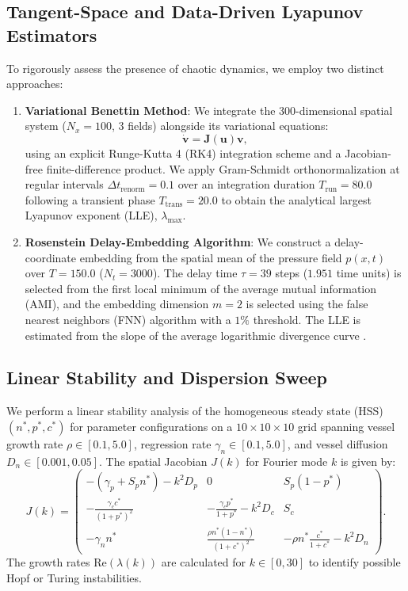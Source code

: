 \documentclass[review,3p,times]{elsarticle}
\begin{document}
\subsection{Tangent-Space and Data-Driven Lyapunov Estimators}
To rigorously assess the presence of chaotic dynamics, we employ two distinct approaches:
\begin{enumerate}
  \item \textbf{Variational Benettin Method}: We integrate the 300-dimensional spatial system ($N_x = 100$, 3 fields) alongside its variational equations:
  \begin{equation}
  \dot{\mathbf{v}} = \mathbf{J}(\mathbf{u})\mathbf{v},
  \end{equation}
  using an explicit Runge-Kutta 4 (RK4) integration scheme and a Jacobian-free finite-difference product. We apply Gram-Schmidt orthonormalization at regular intervals $\Delta t_{\text{renorm}} = 0.1$ over an integration duration $T_{\text{run}} = 80.0$ following a transient phase $T_{\text{trans}} = 20.0$ to obtain the analytical largest Lyapunov exponent (LLE), $\lambda_{\max}$.
  \item \textbf{Rosenstein Delay-Embedding Algorithm}: We construct a delay-coordinate embedding from the spatial mean of the pressure field $p(x,t)$ over $T = 150.0$ ($N_t = 3000$). The delay time $\tau = 39$ steps ($1.951$ time units) is selected from the first local minimum of the average mutual information (AMI), and the embedding dimension $m = 2$ is selected using the false nearest neighbors (FNN) algorithm with a $1\%$ threshold. The LLE is estimated from the slope of the average logarithmic divergence curve \cite{rosenstein1993practical}.
\end{enumerate}

\subsection{Linear Stability and Dispersion Sweep}
We perform a linear stability analysis of the homogeneous steady state (HSS) $(n^*, p^*, c^*)$ for parameter configurations on a $10 \times 10 \times 10$ grid spanning vessel growth rate $\rho \in [0.1, 5.0]$, regression rate $\gamma_n \in [0.1, 5.0]$, and vessel diffusion $D_n \in [0.001, 0.05]$. The spatial Jacobian $J(k)$ for Fourier mode $k$ is given by:
\begin{equation}
J(k) = \begin{pmatrix}
-(\gamma_p + S_p n^*) - k^2 D_p & 0 & S_p (1 - p^*) \\
-\frac{\gamma_c c^*}{(1 + p^*)^2} & -\frac{\gamma_c p^*}{1 + p^*} - k^2 D_c & S_c \\
-\gamma_n n^* & \frac{\rho n^* (1 - n^*)}{(1 + c^*)^2} & -\rho n^* \frac{c^*}{1 + c^*} - k^2 D_n
\end{pmatrix}.
\end{equation}
The growth rates $\text{Re}(\lambda(k))$ are calculated for $k \in [0, 30]$ to identify possible Hopf or Turing instabilities.
\end{document}
